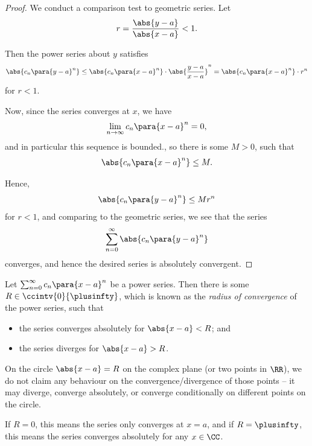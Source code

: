 \begin{proof}
    We conduct a comparison test to geometric series. Let
    \[
        r = \frac{\abs{y - a}}{\abs{x - a}} < 1.
    \]

    Then the power series about \(y\) satisfies
    \[
        \abs{c_n \para{y - a}^{n}} \leq \abs{c_n \para{x - a}^{n}} \cdot \abs{\frac{y - a}{x - a}}^n = \abs{c_n \para{x - a}^{n}} \cdot r^n
    \]
    for \(r < 1\).

    Now, since the series converges at \(x\), we have
    \[
        \lim_{n \to \infty} c_n \para{x - a}^{n} = 0,
    \]
    and in particular this sequence is bounded., so there is some \(M > 0\), such that
    \[
        \abs{c_n \para{x - a}^{n}} \leq M.
    \]

    Hence,
    \[
        \abs{c_n \para{y - a}^n} \leq M r^n
    \]
    for \(r < 1\), and comparing to the geometric series, we see that the series
    \[
        \sum_{n = 0}^{\infty} \abs{c_n \para{y - a}^{n}}
    \]
    converges, and hence the desired series is absolutely convergent.
\end{proof}

\begin{proposition}
    \label{prop:existence-radius-convergence}%
    Let \(\sum_{n = 0}^{\infty} c_n \para{x - a}^{n}\) be a power series. Then there is some \(R \in \ccintv{0}{\plusinfty}\), which is known as the \emph{radius of convergence} of the power series, such that
    \begin{itemize}
        \item the series converges absolutely for \(\abs{x - a} < R\); and
        \item the series diverges for \(\abs{x - a} > R\).
    \end{itemize}
\end{proposition}

\begin{remark}
    On the circle \(\abs{x - a} = R\) on the complex plane (or two points in \(\RR\)), we do not claim any behaviour on the convergence/divergence of those points -- it may diverge, converge absolutely, or converge conditionally on different points on the circle.
\end{remark}

If \(R = 0\), this means the series only converges at \(x = a\), and if \(R = \plusinfty\), this means the series converges absolutely for any \(x \in \CC\).

